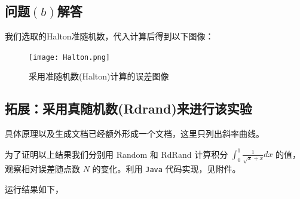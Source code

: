 \documentclass[12pt,a4paper]{article}%
\begin{document}
\subsection{问题$\left(b\right)$解答}

我们选取的Halton准随机数，代入计算后得到以下图像：

\begin{figure}[htbp]
    \centering
    \texttt{[image: Halton.png]}
    \caption{采用准随机数(Halton)计算的误差图像}
\end{figure}

\subsection{拓展：采用真随机数(Rdrand)来进行该实验}

具体原理以及生成文档已经额外形成一个文档，这里只列出斜率曲线。

为了证明以上结果我们分别用 Random 和 RdRand 计算积分 \(\int^1_0 \frac{1}{\sqrt {x} + x} dx\) 的值，观察相对误差随点数 \(N\) 的变化。利用 \texttt{Java} 代码实现，见附件。
    
运行结果如下，
\end{document}

